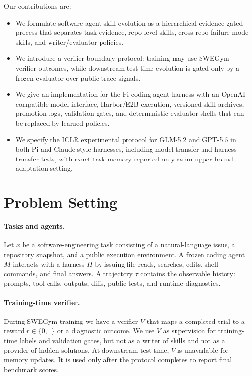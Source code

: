 \documentclass{article}
\begin{document}
Our contributions are:
\begin{itemize}
    \item We formulate software-agent skill evolution as a hierarchical
    evidence-gated process that separates task evidence, repo-level skills,
    cross-repo failure-mode skills, and writer/evaluator policies.
    \item We introduce a verifier-boundary protocol: training may use SWEGym
    verifier outcomes, while downstream test-time evolution is gated only by a
    frozen evaluator over public trace signals.
    \item We give an implementation for the Pi coding-agent harness with an
    OpenAI-compatible model interface, Harbor/E2B execution, versioned skill
    archives, promotion logs, validation gates, and deterministic evaluator
    shells that can be replaced by learned policies.
    \item We specify the ICLR experimental protocol for GLM-5.2 and GPT-5.5 in
    both Pi and Claude-style harnesses, including model-transfer and
    harness-transfer tests, with exact-task memory reported only as an
    upper-bound adaptation setting.
\end{itemize}

\section{Problem Setting}

\paragraph{Tasks and agents.}
Let $x$ be a software-engineering task consisting of a natural-language issue,
a repository snapshot, and a public execution environment. A frozen coding
agent $M$ interacts with a harness $H$ by issuing file reads, searches, edits,
shell commands, and final answers. A trajectory $\tau$ contains the observable
history: prompts, tool calls, outputs, diffs, public tests, and runtime
diagnostics.

\paragraph{Training-time verifier.}
During SWEGym training we have a verifier $V$ that maps a completed trial to a
reward $r \in \{0,1\}$ or a diagnostic outcome. We use $V$ as supervision for
training-time labels and validation gates, but not as a writer of skills and not
as a provider of hidden solutions. At downstream test time, $V$ is unavailable
for memory updates. It is used only after the protocol completes to report final
benchmark scores.
\end{document}
